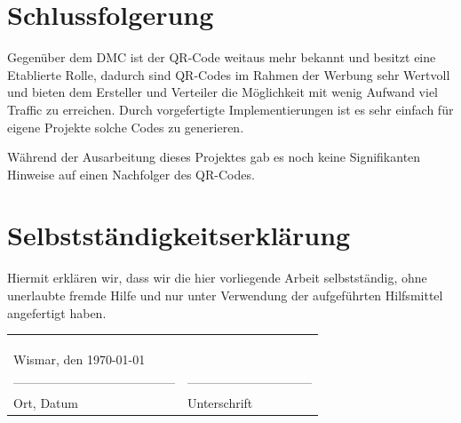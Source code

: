 \documentclass[12pt,					%
							 oneside,			%
							 a4paper,			%
							 halfparskip,		%
							 liststotoc,			%
							 bibtotoc,			%
							 fleqn,				%
							 pointlessnumbers]	%
							 {scrreprt}
\begin{document}
\chapter{Schlussfolgerung}
Gegenüber dem DMC ist der QR-Code weitaus mehr bekannt und besitzt eine Etablierte Rolle, dadurch sind QR-Codes im Rahmen der Werbung sehr Wertvoll und bieten dem Ersteller und Verteiler die Möglichkeit mit wenig Aufwand viel Traffic zu erreichen. 
Durch vorgefertigte Implementierungen ist es sehr einfach für eigene Projekte solche Codes zu generieren. 

Während der Ausarbeitung dieses Projektes gab es noch keine Signifikanten Hinweise auf einen Nachfolger des QR-Codes. 








	
	
	\nocite{*}						%
	

	\listoffigures						%

	\appendix
	

	\chapter*{Selbstst\"andigkeitserkl\"arung}
	Hiermit erkl\"aren wir, dass wir die hier vorliegende Arbeit selbstst\"andig,
	ohne unerlaubte fremde Hilfe und nur unter Verwendung der aufgef\"uhrten
	Hilfsmittel angefertigt haben.

	\begin{tabular}{p{10cm}p{13cm}}
		\\
  		\\
  		\\
  		\\
  		Wismar, den \today \\
  		---------------------------------------  & ------------------------------ \\
  		Ort, Datum & Unterschrift
	\end{tabular}
	
\end{document}
